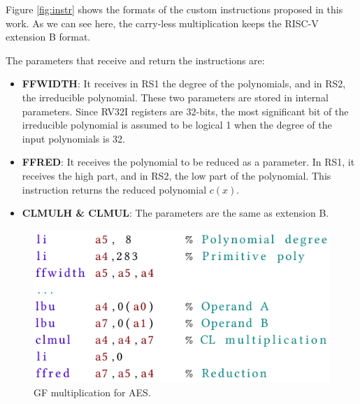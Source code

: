 Figure \ref{fig:instr} shows the formats of the custom instructions proposed in this work. As we can see here, the carry-less multiplication 
keeps the RISC-V extension B format. 

The parameters that receive and return the instructions are:

\begin{itemize}
    \item \textbf{FFWIDTH}: It receives in RS1 the degree of the polynomials, and in RS2, the irreducible polynomial. 
    These two parameters are stored in internal parameters. Since RV32I registers are 32-bits, 
    the most significant bit of the irreducible polynomial is assumed to be logical 1 when the degree of the input polynomials is 32.
    \item \textbf{FFRED}: It receives the polynomial to be reduced as a parameter. In RS1, it receives the high part, and in RS2, the low part of the polynomial. 
    This instruction returns the reduced polynomial $c(x)$. 
    \item \textbf{CLMULH \& CLMUL}: The parameters are the same as extension B.
\end{itemize}



\begin{figure}[b]
    \centering
    \includegraphics[width=0.95\linewidth]{img/asm.png}
    \caption{GF multiplication for AES.}
    \label{fig:asm}
\end{figure}

